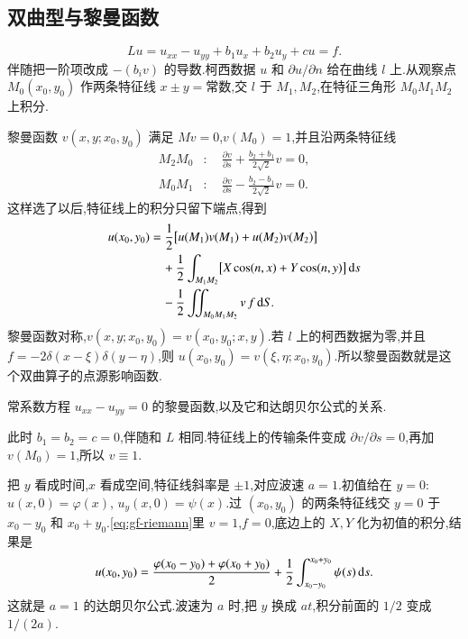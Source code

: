 \subsection{双曲型与黎曼函数}
\begin{equation}
  Lu=u_{xx}-u_{yy}+b_1 u_x+b_2 u_y+c u=f.
\end{equation}
伴随把一阶项改成 $-(b_i v)$ 的导数.柯西数据 $u$ 和 $\partial u/\partial n$ 给在曲线 $l$ 上.从观察点 $M_0(x_0,y_0)$ 作两条特征线 $x\pm y=\textrm{常数}$,交 $l$ 于 $M_1,M_2$,在特征三角形 $M_0M_1M_2$ 上积分.

黎曼函数 $v(x,y;x_0,y_0)$ 满足 $Mv=0$,$v(M_0)=1$,并且沿两条特征线
\begin{align}
  M_2M_0&:\quad
    \frac{\partial v}{\partial s}+\frac{b_2+b_1}{2\sqrt{2}}v=0, \\
  M_0M_1&:\quad
    \frac{\partial v}{\partial s}-\frac{b_2-b_1}{2\sqrt{2}}v=0.
\end{align}
这样选了以后,特征线上的积分只留下端点,得到
\begin{equation}
\begin{aligned}
  u(x_0,y_0)
  &={\frac{1}{2}}\bigl[u(M_1)v(M_1)+u(M_2)v(M_2)\bigr] \\
  &\quad+{\frac{1}{2}}\int_{M_1M_2}
      \bigl[X\cos(n,x)+Y\cos(n,y)\bigr]\,\mathrm{d}s \\
  &\quad-{\frac{1}{2}}\iint_{M_0M_1M_2} v\,f\,\mathrm{d}S.
\end{aligned}
\label{eq:gf-riemann}
\end{equation}
黎曼函数对称,$v(x,y;x_0,y_0)=v(x_0,y_0;x,y)$.若 $l$ 上的柯西数据为零,并且 $f=-2\delta(x-\xi)\delta(y-\eta)$,则 $u(x_0,y_0)=v(\xi,\eta;x_0,y_0)$.所以黎曼函数就是这个双曲算子的点源影响函数.

\begin{example}
常系数方程 $u_{xx}-u_{yy}=0$ 的黎曼函数,以及它和达朗贝尔公式的关系.
\end{example}
\begin{solution}
此时 $b_1=b_2=c=0$,伴随和 $L$ 相同.特征线上的传输条件变成 $\partial v/\partial s=0$,再加 $v(M_0)=1$,所以 $v\equiv 1$.

把 $y$ 看成时间,$x$ 看成空间,特征线斜率是 $\pm 1$,对应波速 $a=1$.初值给在 $y=0$:$u(x,0)=\varphi(x)$, $u_y(x,0)=\psi(x)$.过 $(x_0,y_0)$ 的两条特征线交 $y=0$ 于 $x_0-y_0$ 和 $x_0+y_0$.\eqref{eq:gf-riemann}里 $v=1$,$f=0$,底边上的 $X,Y$ 化为初值的积分,结果是
\begin{equation}
  u(x_0,y_0)
  =\frac{\varphi(x_0-y_0)+\varphi(x_0+y_0)}{2}
  +{\frac{1}{2}}\int_{x_0-y_0}^{x_0+y_0}\psi(s)\,\mathrm{d}s.
\end{equation}
这就是 $a=1$ 的达朗贝尔公式.波速为 $a$ 时,把 $y$ 换成 $at$,积分前面的 $1/2$ 变成 $1/(2a)$.
\end{solution}
